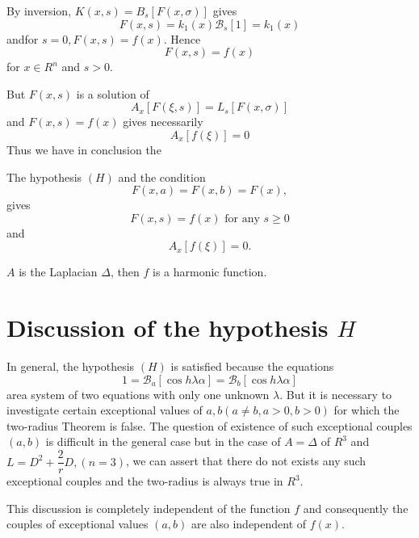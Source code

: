 By inversion, $K(x, s) = B_s [F(x, \sigma)]$ gives
$$
F(x, s) = k_1(x) \mathscr{B}_s [1] = k_1(x)
$$
and\pageoriginale for $s = 0, F(x, s) = f(x)$. Hence
\begin{equation*}
  F(x, s) = f(x) \tag{16}\label{part3:chap1:sec3:eq16}
\end{equation*}
for $x \in R^n$ and $s > 0$.

But $F(x, s)$ is a solution of
$$
A_x \left[F (\xi, s)\right] = L_s \left[F(x, \sigma)\right]
$$
and $F(x, s) = f(x)$ gives necessarily
\begin{equation*}
  A_x \left [f(\xi) \right] = 0 \tag{17}\label{part3:chap1:sec3:eq17}
\end{equation*}
Thus we have in conclusion the

\begin{theorem*}
  The hypothesis $(H)$ and the condition
  $$
  F(x, a)= F(x, b) = F(x),
  $$
  gives
  $$
  F(x, s)= f(x) \text{ for any }s \geq 0 
  $$
  and
  $$
  A_x  \left [f(\xi) \right ]= 0.
  $$
\end{theorem*}

\begin{coro*}
  $A$ is the Laplacian $\Delta$, then $f$ is a harmonic function.
\end{coro*}

\section{Discussion of the hypothesis $H$}\label{part3:chap1:sec4}%

In general, the hypothesis $(H)$ is satisfied because the equations
$$
1 = \mathscr{B}_a \left [\cos h  \lambda \alpha \right ] =
\mathscr{B}_b \left [\cos h \lambda \alpha \right ] 
$$
are\pageoriginale a system of two equations with only one unknown $\lambda$. But it
is necessary to investigate certain exceptional values of $a, b (a
\neq b, a> 0, b > 0)$ for which the two-radius Theorem is false. The
question of existence of such exceptional couples $(a, b)$ is
difficult in the general case but in the case of $A = \Delta$ of $R^3$
and $L=D^2 + \dfrac{2}{r}D, (n=3)$, we can assert that there do not
exists any such exceptional couples and the two-radius is always true
in $R^3$. 

\begin{remark*}
  This discussion is completely independent of the function $f$ and
  consequently the couples of exceptional values $(a, b)$ are also
  independent of $f(x)$. 
\end{remark*}

